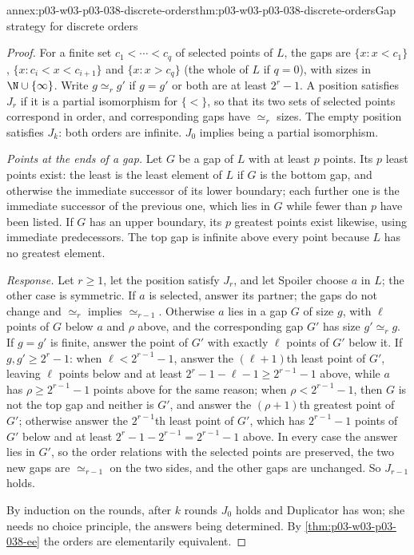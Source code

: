 \begin{annexitem}{annex:p03-w03-p03-038-discrete-orders}{thm:p03-w03-p03-038-discrete-orders}{Gap strategy for discrete orders}
\begin{proof}
For a finite set \(c_1<\cdots<c_q\) of selected points of \(L\), the gaps
are \(\{x:x<c_1\}\), \(\{x:c_i<x<c_{i+1}\}\) and \(\{x:x>c_q\}\) (the whole
of \(L\) if \(q=0\)), with sizes in \(\N\cup\{\infty\}\). Write
\(g\simeq_rg'\) if \(g=g'\) or both are at least \(2^r-1\). A position
satisfies \(J_r\) if it is a partial isomorphism for \(\{<\}\), so that
its two sets of selected points correspond in order, and corresponding
gaps have \(\simeq_r\) sizes. The empty position satisfies \(J_k\): both
orders are infinite. \(J_0\) implies being a partial isomorphism.

\emph{Points at the ends of a gap.} Let \(G\) be a gap of \(L\) with at
least \(p\) points. Its \(p\) least points exist: the least is the least
element of \(L\) if \(G\) is the bottom gap, and otherwise the immediate
successor of its lower boundary; each further one is the immediate
successor of the previous one, which lies in \(G\) while fewer than \(p\)
have been listed. If \(G\) has an upper boundary, its \(p\) greatest points
exist likewise, using immediate predecessors. The top gap is infinite above
every point because \(L\) has no greatest element.

\emph{Response.} Let \(r\ge1\), let the position satisfy \(J_r\), and let
Spoiler choose \(a\) in \(L\); the other case is symmetric. If \(a\) is
selected, answer its partner; the gaps do not change and \(\simeq_r\)
implies \(\simeq_{r-1}\). Otherwise \(a\) lies in a gap \(G\) of size
\(g\), with \(\ell\) points of \(G\) below \(a\) and \(\rho\) above, and
the corresponding gap \(G'\) has size \(g'\simeq_rg\). If \(g=g'\) is
finite, answer the point of \(G'\) with exactly \(\ell\) points of \(G'\)
below it. If \(g,g'\ge2^r-1\): when \(\ell<2^{r-1}-1\), answer the
\((\ell+1)\)th least point of \(G'\), leaving \(\ell\) points below and at
least \(2^r-1-\ell-1\ge2^{r-1}-1\) above, while \(a\) has
\(\rho\ge2^{r-1}-1\) points above for the same reason; when
\(\rho<2^{r-1}-1\), then \(G\) is not the top gap and neither is \(G'\),
and answer the \((\rho+1)\)th greatest point of \(G'\); otherwise answer the
\(2^{r-1}\)th least point of \(G'\), which has \(2^{r-1}-1\) points of
\(G'\) below and at least \(2^r-1-2^{r-1}=2^{r-1}-1\) above. In every case
the answer lies in \(G'\), so the order relations with the selected points
are preserved, the two new gaps are \(\simeq_{r-1}\) on the two sides, and
the other gaps are unchanged. So \(J_{r-1}\) holds.

By induction on the rounds, after \(k\) rounds \(J_0\) holds and Duplicator
has won; she needs no choice principle, the answers being determined. By
\cref{thm:p03-w03-p03-038-ee} the orders are elementarily equivalent.
\end{proof}
\end{annexitem}

